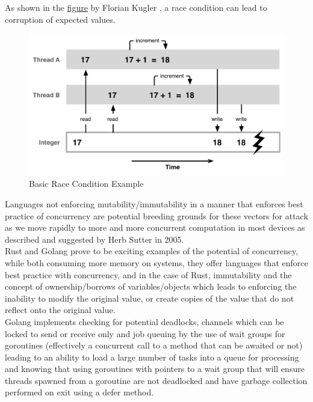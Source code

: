 \documentclass{IEEEtran}
\begin{document}
            As shown in the \hyperref[fig:race-condition]{\color{blue}figure} by Florian Kugler
            \cite{Florian-Kugler}, a race condition can 
            lead to corruption of expected values.
            \begin{figure}[h]
                \includegraphics[width=\linewidth]{Images/race-condition.png}
                \caption{Basic Race Condition Example}
                \label{fig:race-condition}
            \end{figure}

            Languages not enforcing mutability/immutability in a manner that enforces best practice 
            of concurrency are potential breeding grounds for these vectors for attack as we move 
            rapidly to more and more concurrent computation in most devices as described and 
            suggested by Herb Sutter\cite{Herb-Sutter} in 2005.
            \medskip
            \\
            Rust\cite{Rust} and Golang\cite{Golang} prove to be exciting examples of the potential
            of concurrency, while both consuming more memory on systems, they offer languages 
            that enforce best practice with concurrency\cite{sima2012secure}, and in the case of Rust, immutability and
            the concept of ownership/borrows of variables/objects which leads to enforcing the 
            inability to modify the original value, or create copies of the value that do not
            reflect onto the original value.
            \medskip
            \\            
            Golang implements checking for potential deadlocks, channels which can be locked to send or receive only and job queuing by the use of wait groups for goroutines
            (effectively a concurrent call to a method that can be awaited or not) leading to 
            an ability to load a large number of tasks into a queue for processing and knowing 
            that using goroutines with pointers to a wait group that will ensure threads spawned
            from a goroutine are not deadlocked and have garbage collection performed on exit 
            using a defer method.
\end{document}
